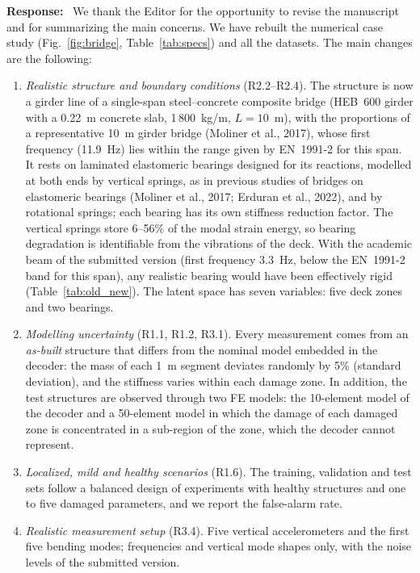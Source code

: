 \documentclass[11pt]{article}
\newenvironment{response}{\par\smallskip\noindent\color{resp}\textbf{Response:}\ }{\par}
\begin{document}
\begin{response}
We thank the Editor for the opportunity to revise the manuscript and for summarizing the main concerns. We have
rebuilt the numerical case study (Fig.~\ref{fig:bridge}, Table~\ref{tab:specs}) and all the datasets. The main changes
are the following:
\begin{enumerate}[leftmargin=*]
\item \emph{Realistic structure and boundary conditions} (R2.2--R2.4). The structure is now a girder line of a
single-span steel--concrete composite bridge (HEB~600 girder with a 0.22~m concrete slab, 1\,800~kg/m, $L=10$~m), with
the proportions of a representative 10~m girder bridge (Moliner et al., 2017), whose first frequency (11.9~Hz) lies
within the range given by EN~1991-2 for this span. It rests on laminated elastomeric bearings designed for its
reactions, modelled at both ends by vertical springs, as in previous studies of bridges on elastomeric bearings
(Moliner et al., 2017; Erduran et al., 2022), and by rotational springs; each bearing has its own stiffness reduction
factor. The vertical springs store 6--56\% of the modal strain energy, so bearing degradation
is identifiable from the vibrations of the deck. With the academic beam of the submitted version (first frequency
3.3~Hz, below the EN~1991-2 band for this span), any realistic bearing would have been effectively rigid
(Table~\ref{tab:old_new}). The latent space has seven variables: five deck zones and two bearings.
\item \emph{Modelling uncertainty} (R1.1, R1.2, R3.1). Every measurement comes from an \emph{as-built} structure that
differs from the nominal model embedded in the decoder: the mass of each 1~m segment deviates randomly by 5\% (standard
deviation), and the stiffness varies within each damage zone. In addition, the test structures are observed through
two FE models: the 10-element model of the decoder and a 50-element model in which the damage of each damaged zone is
concentrated in a sub-region of the zone, which the decoder cannot represent.
\item \emph{Localized, mild and healthy scenarios} (R1.6). The training, validation and test sets follow a balanced
design of experiments with healthy structures and one to five damaged parameters, and we report the false-alarm rate.
\item \emph{Realistic measurement setup} (R3.4). Five vertical accelerometers and the first five bending modes;
frequencies and vertical mode shapes only, with the noise levels of the submitted version.

\end{enumerate}
\end{response}
\end{document}

